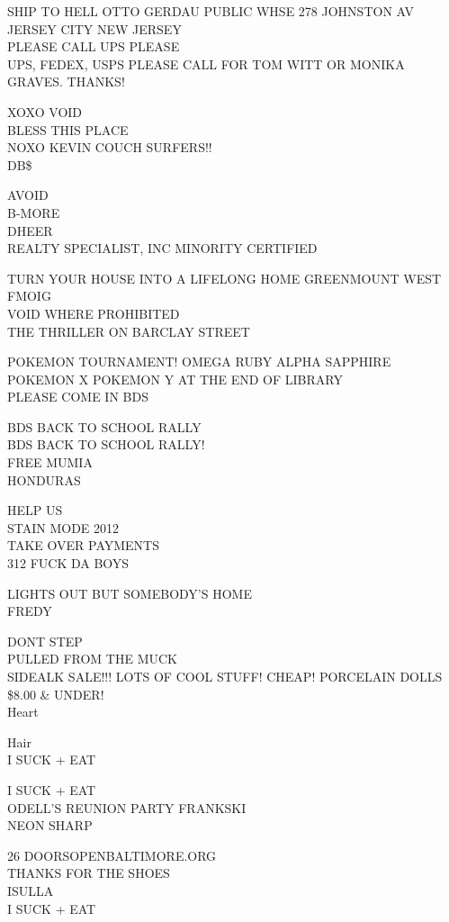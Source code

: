 \documentclass[10pt,letterpaper]{article}
\begin{document}
SHIP TO HELL OTTO GERDAU PUBLIC WHSE 278 JOHNSTON AV JERSEY CITY NEW JERSEY\\
PLEASE CALL UPS PLEASE\\
UPS, FEDEX, USPS PLEASE CALL FOR TOM WITT OR MONIKA GRAVES.  THANKS!

XOXO VOID\\
BLESS THIS PLACE\\
NOXO KEVIN COUCH SURFERS!!\\
DB\$

AVOID\\
B{-}MORE\\
DHEER\\
REALTY SPECIALIST, INC MINORITY CERTIFIED

TURN YOUR HOUSE INTO A LIFELONG HOME GREENMOUNT WEST\\
FMOIG\\
VOID WHERE PROHIBITED\\
THE THRILLER ON BARCLAY STREET

POKEMON TOURNAMENT!  OMEGA RUBY ALPHA SAPPHIRE POKEMON X POKEMON Y AT THE END OF LIBRARY\\
PLEASE COME IN BDS

BDS BACK TO SCHOOL RALLY\\
BDS BACK TO SCHOOL RALLY!\\
FREE MUMIA\\
HONDURAS

HELP US\\
STAIN MODE 2012\\
TAKE OVER PAYMENTS\\
312 FUCK DA BOYS

LIGHTS OUT BUT SOMEBODY'S HOME\\
FREDY

DONT STEP\\
PULLED FROM THE MUCK\\
SIDEALK SALE!!!  LOTS OF COOL STUFF!  CHEAP!  PORCELAIN DOLLS \$8.00 \& UNDER!\\
Heart

Hair\\
I SUCK + EAT

I SUCK + EAT\\
ODELL'S REUNION PARTY FRANKSKI\\
NEON SHARP

26 DOORSOPENBALTIMORE.ORG\\
THANKS FOR THE SHOES\\
ISULLA\\
I SUCK + EAT
\end{document}
